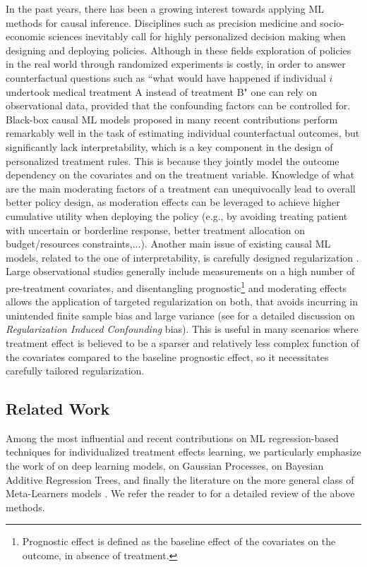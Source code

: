 \documentclass[nohyperref]{article}
\theoremstyle{plain}
\theoremstyle{definition}
\theoremstyle{remark}
\begin{document}
In the past years, there has been a growing interest towards applying ML methods for causal inference. Disciplines such as precision medicine and socio-economic sciences inevitably call for highly personalized decision making when designing and deploying policies. Although in these fields exploration of policies in the real world through randomized experiments is costly, in order to answer counterfactual questions such as ``what would have happened if individual $i$ undertook medical treatment A instead of treatment B" one can rely on observational data, provided that the confounding factors can be controlled for. Black-box causal ML models proposed in many recent contributions perform remarkably well in the task of estimating individual counterfactual outcomes, but significantly lack interpretability, which is a key component in the design of personalized treatment rules. This is because they jointly model the outcome dependency on the covariates and on the treatment variable. Knowledge of what are the main moderating factors of a treatment can unequivocally lead to overall better policy design, as moderation effects can be leveraged to achieve higher cumulative utility when deploying the policy (e.g., by avoiding treating patient with uncertain or borderline response, better treatment allocation on budget/resources constraints,...). Another main issue of existing causal ML models, related to the one of interpretability, is carefully designed regularization \citep{wager_2020, hahn_2020, caron_2021}. Large observational studies generally include measurements on a high number of pre-treatment covariates, and disentangling prognostic\footnote{Prognostic effect is defined as the baseline effect of the covariates on the outcome, in absence of treatment.} and moderating effects allows the application of targeted regularization on both, that avoids incurring in unintended finite sample bias and large variance (see \cite{hahn_2020} for a detailed discussion on \emph{Regularization Induced Confounding} bias). This is useful in many scenarios where treatment effect is believed to be a sparser and relatively less complex function of the covariates compared to the baseline prognostic effect, so it necessitates carefully tailored regularization.



\subsection{Related Work}

Among the most influential and recent contributions on ML regression-based techniques for individualized treatment effects learning, we particularly emphasize the work of \cite{johansson_2016, shalit_2017, yao_2018} on deep learning models, \cite{vanderschaar_2017, vanderschaar_2018} on Gaussian Processes, \cite{hahn_2020, caron_2021} on Bayesian Additive Regression Trees, and finally the literature on the more general class of Meta-Learners models \cite{kunzel_2017, nie_2020}. We refer the reader to \cite{caron_2020} for a detailed review of the above methods. 
\end{document}
